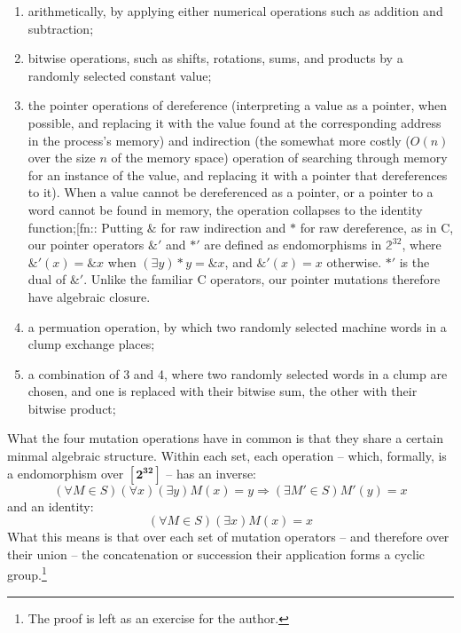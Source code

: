\documentclass[12pt,glossary]{dalthesis}
\begin{document}
\begin{enumerate}
\item arithmetically, by applying either numerical operations such as addition and
subtraction;
\item bitwise operations, such as shifts, rotations, sums, and products by
a randomly selected constant value;
\item the pointer operations of dereference (interpreting a value as a pointer,
when possible, and replacing it with the value found at the corresponding
address in the process's memory) and indirection (the somewhat more
costly (\(O(n)\) over the size \(n\) of the memory space) operation of
searching through memory for an instance of the value, and replacing
it with a pointer that dereferences to it). When a value cannot be
dereferenced as a pointer, or a pointer to a word cannot be found in
memory, the operation collapses to the identity function;[fn::
Putting \(\&\) for raw indirection and \(*\) for raw dereference, as in C,
our pointer operators \(\&'\) and \(*'\) are defined as endomorphisms in
\(\mathbb{2}^{32}\), where \(\&'(x) = \&x\) when \((\exists y) *y = \&x\),
and \(\&'(x) = x\) otherwise. \(*'\) is the dual of \(\&'\). Unlike the
familiar C operators, our pointer mutations therefore have algebraic
closure.
\item a permuation operation, by which two randomly selected machine words in a clump exchange
places;
\item a combination of 3 and 4, where two randomly selected words in a clump are chosen,
and one is replaced with their bitwise sum, the other with their bitwise product;
\end{enumerate}

What the four mutation operations have in common is that
they share a certain minmal algebraic structure. Within each set, each
operation -- which, formally, is a endomorphism over \(\mathbf{[2^{32}]}\) --
has an inverse: 
\[
(\forall M\in S)(\forall x)(\exists y) M(x) = y \Rightarrow 
(\exists M'\in S) M'(y) = x
\]
and an identity:
\[
(\forall M\in S)(\exists x) M(x) = x
\]
What this means is that over each set of mutation operators -- and
therefore over their union -- the concatenation or succession their
application forms a cyclic group.\footnote{The proof is left as an exercise for the author.}
\end{document}
